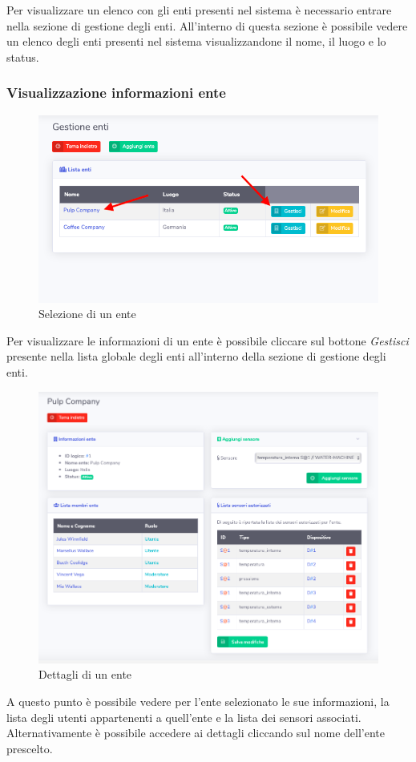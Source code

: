 		Per visualizzare un elenco con gli enti presenti nel sistema è necessario entrare nella sezione di gestione degli enti. All'interno di questa sezione è possibile vedere un elenco degli enti presenti nel sistema visualizzandone il nome, il luogo e lo status.			

	\subsubsection{Visualizzazione informazioni ente}

		\begin{figure}[H]
		\centering
		\includegraphics[scale=0.600]{res/images/admin/selDettEnte.png}
		\caption{Selezione di un ente}
	\end{figure}

		Per visualizzare le informazioni di un ente è possibile cliccare sul bottone \textit{Gestisci} presente nella lista globale degli enti all'interno della sezione di gestione degli enti. 

		\begin{figure}[H]
		\centering
		\includegraphics[scale=0.480]{res/images/admin/dettEnte.png}
		\caption{Dettagli di un ente}
	\end{figure}
	A questo punto è possibile vedere per l'ente selezionato le sue informazioni, la lista degli utenti appartenenti a quell'ente e la lista dei sensori associati.
	Alternativamente è possibile accedere ai dettagli cliccando sul nome dell'ente prescelto.

